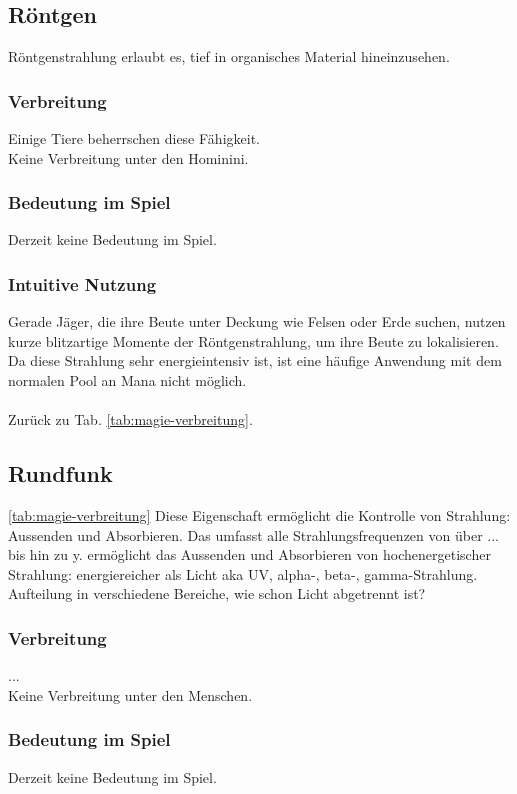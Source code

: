 \subsection{Röntgen}\label{sec:roentgenmagie}
Röntgenstrahlung erlaubt es, tief in organisches Material hineinzusehen. 

\subsubsection{Verbreitung}
Einige Tiere beherrschen diese Fähigkeit. \\
Keine Verbreitung unter den Hominini.

\subsubsection{Bedeutung im Spiel}
Derzeit keine Bedeutung im Spiel.

\subsubsection{Intuitive Nutzung}
Gerade Jäger, die ihre Beute unter Deckung wie Felsen oder Erde suchen, nutzen kurze blitzartige Momente der Röntgenstrahlung, um ihre Beute zu lokalisieren.
Da diese Strahlung sehr energieintensiv ist, ist eine häufige Anwendung mit dem normalen Pool an Mana nicht möglich.
\\ \\
Zurück zu Tab. \ref{tab:magie-verbreitung}.



\subsection{Rundfunk}\label{sec:rundfunkmagie} \ref{tab:magie-verbreitung} %
Diese Eigenschaft ermöglicht die Kontrolle von Strahlung: Aussenden und Absorbieren. Das umfasst alle Strahlungsfrequenzen von  über ... bis hin zu y.
ermöglicht das Aussenden und Absorbieren von hochenergetischer Strahlung: energiereicher als Licht aka UV, alpha-, beta-, gamma-Strahlung. Aufteilung in verschiedene Bereiche, wie schon Licht abgetrennt ist? 

\subsubsection{Verbreitung}
...\\
Keine Verbreitung unter den Menschen.

\subsubsection{Bedeutung im Spiel}
Derzeit keine Bedeutung im Spiel.

